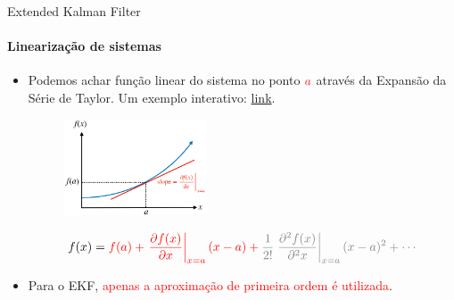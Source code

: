 \documentclass[aspectratio=169]{beamer}
\begin{document}
\begin{frame}[c]{Extended Kalman Filter}
    \framesubtitle{Linearização de sistemas}
    \begin{itemize}
        \item Podemos achar função linear do sistema no ponto $\color{red}{a}$ através da Expansão da Série de Taylor. Um exemplo interativo: \href{https://www.desmos.com/calculator/oiexhzavjp}{link}.

    \begin{figure}
        \centering
        \includegraphics[width=0.4\textwidth]{./images/taylor.png}
    \end{figure}

        \begin{equation}
            f(x) = \color{red}{f(a) + \left. \frac{\partial f(x)}{\partial x} \right\vert_{x=a}(x-a)} + 
            \color{gray}{\frac{1}{2!}\left. \frac{\partial^2 f(x)}{\partial^2 x} \right\vert_{x=a}(x-a)^2 + \cdots}
        \end{equation}

        \item Para o EKF, \textcolor{red}{apenas a aproximação de primeira ordem é utilizada}.
    \end{itemize}

\end{frame}
\end{document}
